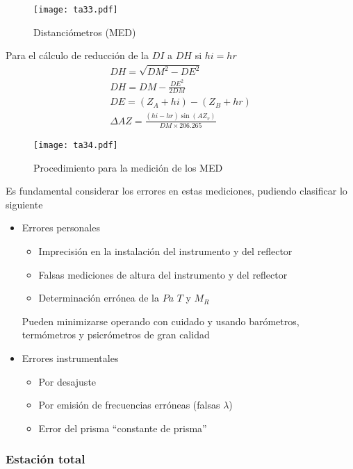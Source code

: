 \begin{figure}[h!]
\centering
  \texttt{[image: ta33.pdf]}
  \caption{Distanciómetros (MED)}
  \label{ta33}
\end{figure}

Para el cálculo de reducción de la $DI$ a $DH$ si $hi=hr$
\begin{align}
    DH = \sqrt{DM^2 - DE^2}\\
    DH = DM -\frac{DE^2}{2DM}\\
    DE =\left(Z_A + hi\right) -\left(Z_B + hr\right)\\
    \Delta AZ = \frac{(hi - hr)\sin{(AZ_v)}}{DM\times 206.265}
\end{align}

\begin{figure}[h!]
\centering
  \texttt{[image: ta34.pdf]}
  \caption{Procedimiento para la medición de los MED}
  \label{ta34}
\end{figure}

Es fundamental considerar los errores en estas mediciones, pudiendo clasificar lo siguiente
\begin{itemize}
    \item Errores personales \begin{itemize}
        \item Imprecisión en la instalación del instrumento y del reflector
        \item Falsas mediciones de altura del instrumento y del reflector
        \item Determinación errónea de la $Pa$ $T$ y $M_R$
    \end{itemize}
    Pueden minimizarse operando con cuidado y usando barómetros, termómetros y psicrómetros de gran calidad
    \item Errores instrumentales \begin{itemize}
        \item Por desajuste
        \item Por emisión de frecuencias erróneas (falsas $\lambda$)
        \item Error del prisma ``constante de prisma''
    \end{itemize}
\end{itemize}

\subsubsection{Estación total}

